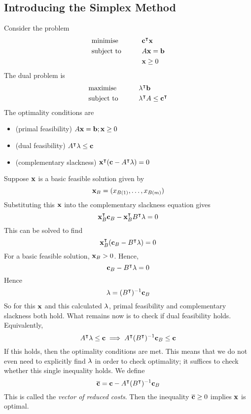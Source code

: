 \subsection{Introducing the Simplex Method}
Consider the problem
\begin{alignat*}{2}
    & \text{minimise} & \qquad & \vb c^\intercal \vb x     \\
    & \text{subject to}                             &        & A \vb x = \vb b   \\
    &                                               &        & \vb x \geq 0
\end{alignat*}
The dual problem is
\begin{alignat*}{2}
    & \text{maximise} & \qquad & \vb \lambda^\intercal \vb b     \\
    & \text{subject to}                             &        & \vb \lambda^\intercal A \leq \vb c^\intercal \\
\end{alignat*}
The optimality conditions are
\begin{itemize}
    \item (primal feasibility) \( A \vb x = \vb b; \vb x \geq 0 \)
    \item (dual feasibility) \( A^\intercal \vb \lambda \leq \vb c \)
    \item (complementary slackness) \( \vb x^\intercal (\vb c - A^\intercal \vb \lambda) = 0 \)
\end{itemize}
Suppose \( \vb x \) is a basic feasible solution given by
\[ \vb x_B = (x_{B(1)}, \dots, x_{B(m)}) \]
Substituting this \( \vb x \) into the complementary slackness equation gives
\[ \vb x_B^\intercal \vb c_B - \vb x_B^\intercal B^\intercal \vb \lambda = 0 \]
This can be solved to find
\[ \vb x_B^\intercal (\vb c_B - B^\intercal \vb \lambda) = 0 \]
For a basic feasible solution, \( \vb x_B > 0 \). Hence,
\[ \vb c_B - B^\intercal \vb \lambda = 0 \]
Hence
\[ \vb \lambda = (B^\intercal)^{-1} \vb c_B \]
So for this \( \vb x \) and this calculated \( \vb \lambda \), primal feasibility and complementary slackness both hold. What remains now is to check if dual feasibility holds. Equivalently,
\[ A^\intercal \vb \lambda \leq \vb c \implies A^\intercal (B^\intercal)^{-1} \vb c_B \leq \vb c \]
If this holds, then the optimality conditions are met. This means that we do not even need to explicitly find \( \vb \lambda \) in order to check optimality; it suffices to check whether this single inequality holds.
We define
\[ \overline{\vb c} = \vb c - A^\intercal (B^\intercal)^{-1} \vb c_B \]
This is called the \textit{vector of reduced costs}. Then the inequality \( \overline{\vb c} \geq 0 \) implies \( \vb x \) is optimal.
